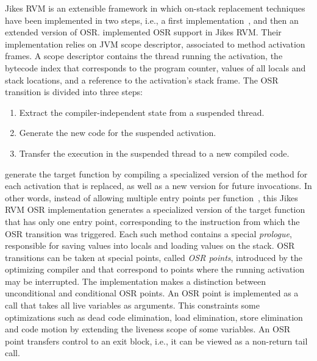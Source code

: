 Jikes RVM is an extensible framework in which on-stack replacement techniques have been implemented in two steps, i.e., a first implementation~\cite{fink2003design}, and then an extended version of OSR\cite{soman2006efficient}.
 implemented OSR support in Jikes RVM. 
Their implementation relies on JVM scope descriptor, associated to method activation frames.
A scope descriptor contains the thread running the activation, the bytecode index that corresponds to the program counter, values of all locals and stack locations, and a reference to the activation's stack frame.
The OSR transition is divided into three steps: 
\begin{enumerate}
    \item Extract the compiler-independent state from a suspended thread. 
    \item Generate the new code for the suspended activation.
    \item Transfer the execution in the suspended thread to a new compiled code.
\end{enumerate}
 generate the target function by compiling a specialized version of the method for each activation that is replaced, as well as a new version for future invocations.
In other words, instead of allowing multiple entry points per function~\cite{lameed2013modular, paleczny2001java}, this Jikes RVM OSR implementation generates a specialized version of the target function that has only one entry point, corresponding to the instruction from which the OSR transition was triggered.
Each such method contains a special \textit{prologue}, responsible for saving values into locals and loading values on the stack.
OSR transitions can be taken at special points, called \textit{OSR points}, introduced by the optimizing compiler and that correspond to points where the running activation may be interrupted.
The implementation makes a distinction between unconditional and conditional OSR points.
An OSR point is implemented as a call that takes all live variables as arguments. 
This constraints some optimizations such as dead code elimination, load elimination, store elimination and code motion by extending the liveness scope of some variables.
An OSR point transfers control to an exit block, i.e., it can be viewed as a non-return tail call.\\


